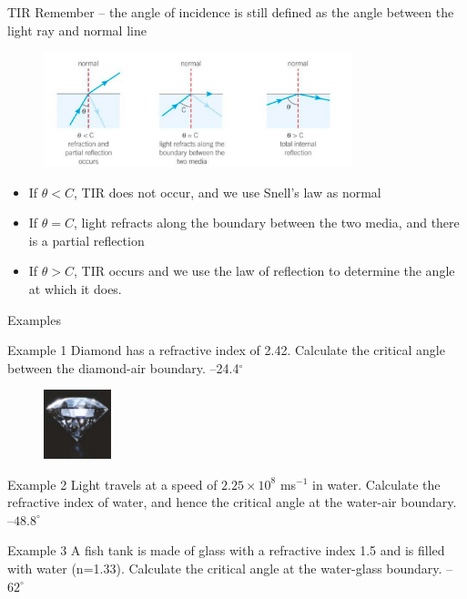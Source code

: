 \documentclass[../Main.tex]{subfiles}
\begin{document}
\begin{frame}{TIR}
Remember -- the angle of incidence is still defined as the angle between the light ray and normal line
    \begin{figure}
        \centering
        \includegraphics[width=0.8\textwidth]{Waves_Images/criticalangle.jpg}
    \end{figure}
    \begin{itemize}
        \item If $\theta < C$, TIR does not occur, and we use Snell's law as normal
        \item If $\theta = C$, light refracts along the boundary between the two media, and there is a partial reflection
        \item If $\theta > C$, TIR occurs and we use the law of reflection to determine the angle at which it does. 
    \end{itemize}
\end{frame}
\begin{frame}{Examples}
\begin{multicols}{2}
\begin{minipage}{9cm}
    \begin{exampleblock}{Example 1}
    Diamond has a refractive index of 2.42. Calculate the critical angle between the diamond-air boundary. \pause
    --24.4$^\circ$
    \end{exampleblock}
    \end{minipage}
    \columnbreak
    \begin{figure}
\hspace{3cm}
        \includegraphics[height=2cm]{Waves_Images/diamond.jpg}
    \end{figure}
    \end{multicols}
    \begin{exampleblock}{Example 2}
    Light travels at a speed of $2.25\times10^8$ ms$^{-1}$ in water. Calculate the refractive index of water, and hence the critical angle at the water-air boundary. \pause
    --$48.8^\circ$
    \end{exampleblock} \pause
    
    \begin{exampleblock}{Example 3}
    A fish tank is made of glass with a refractive index 1.5 and is filled with water (n=1.33). Calculate the critical angle at the water-glass boundary. \pause
    --$62^\circ$
    \end{exampleblock}
\end{frame}
\end{document}

